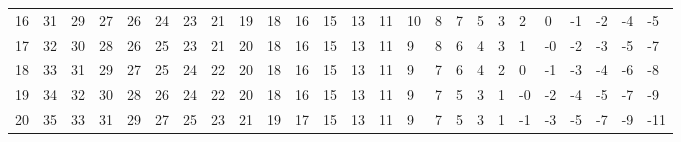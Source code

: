 \begin{table}[htb]
\begin{tabular}{||l|l|l|l|l|l|l|l|l|l|l|l|l|l|l|l|l|l|l|l|l|l|l|l|l||}
      16 &  31&   29&  27&   26 & 24 & 23 & 21&  19 & 18 & 16  &15 & 13 & 11 & 10 &  8&   7&   5&   3 &  2 &  0 & -1 & -2 & -4 & -5 \\
      17 &  32&   30&  28&   26 & 25 & 23 & 21&  20 & 18 & 16  &15 & 13 & 11 &  9 &  8&   6&   4&   3 &  1 & -0 & -2 & -3 & -5 & -7 \\
      18 &  33&   31&  29&   27 & 25 & 24 & 22&  20 & 18 & 16  &15 & 13 & 11 &  9 &  7&   6&   4&   2 &  0 & -1 & -3 & -4 & -6 & -8 \\
      19 &  34&   32&  30&   28 & 26 & 24 & 22&  20 & 18 & 16  &15 & 13 & 11 &  9 &  7&   5&   3&   1 & -0 & -2 & -4 & -5 & -7 & -9 \\
      20 &  35&   33&  31&   29 & 27 & 25 & 23&  21 & 19 & 17  &15 & 13 & 11 &  9 &  7&   5&   3&   1 & -1 & -3 & -5 & -7 & -9 &-11 \\ \hline
	\end{tabular}                                                                                                                     
\end{table}                                                                                                                         
